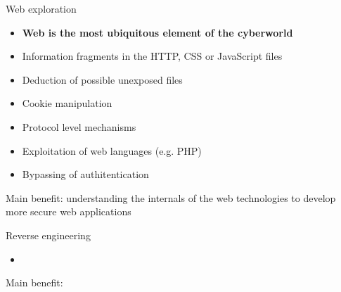 \documentclass[12 pt]{beamer}
\begin{document}

\begin{frame}{Web exploration}

  \begin{itemize}
    \item{\textbf{Web is the most ubiquitous element of the cyberworld}}
    \item{Information fragments in the HTTP, CSS or JavaScript files}
    \item{Deduction of possible unexposed files}
    \item{Cookie manipulation}
    \item{Protocol level mechanisms}
    \item{Exploitation of web languages (e.g. PHP)}
    \item{Bypassing of authitentication}
  \end{itemize}

  \begin{exampleblock}{}
    Main benefit: understanding the internals of the web technologies to develop more secure web applications
  \end{exampleblock}
\end{frame}


\begin{frame}{Reverse engineering}

  \begin{itemize}
    \item{}
  \end{itemize}

  \begin{exampleblock}{}
    Main benefit: 
  \end{exampleblock}

\end{frame}

\end{document}
